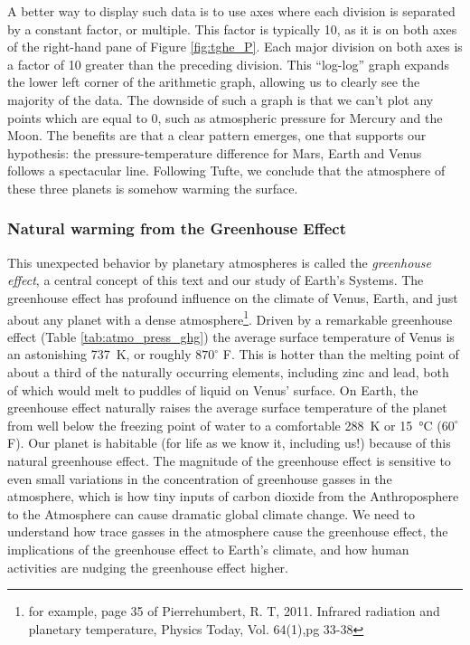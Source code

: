 A better way to display such data is to use axes where each division is separated by a constant factor, or multiple. This factor is typically 10, as it is on both axes of the right-hand pane of Figure \ref{fig:tghe_P}. Each major division on both axes is a factor of 10 greater than the preceding division. This ``log-log'' graph expands the lower left corner of the arithmetic graph, allowing us to clearly see the majority of the data. The downside of such a graph is that we can't plot any points which are equal to 0, such as atmospheric pressure for Mercury and the Moon. The benefits are that a clear pattern emerges, one that supports our hypothesis: the pressure-temperature difference for Mars, Earth and Venus follows a spectacular line. Following Tufte, we conclude that the atmosphere of these three planets is somehow warming the surface.\\

\subsubsection{Natural warming from the Greenhouse Effect}
This unexpected behavior by planetary atmospheres is called the \emph{greenhouse effect}, a central concept of this text and our study of Earth's Systems. The greenhouse effect has profound influence on the climate of Venus, Earth, and just about any planet with a dense atmosphere\footnote{for example, page 35 of Pierrehumbert, R. T, 2011. Infrared radiation and planetary temperature, Physics Today, Vol. 64(1),pg 33-38}. Driven by a remarkable greenhouse effect (Table \ref{tab:atmo_press_ghg}) the average surface temperature of Venus is an astonishing \SI{737}{\kelvin}, or roughly ${870}^{\circ}$ F. This is hotter than the melting point of about a third of the naturally occurring elements, including zinc and lead, both of which would melt to puddles of liquid on Venus' surface. On Earth, the greenhouse effect naturally raises the average surface temperature of the planet from well below the freezing point of water to a comfortable \SI{288}{\kelvin} or \SI{15}{\celsius} (${60}^{\circ}$ F). Our planet is habitable (for life as we know it, including us!) because of this natural greenhouse effect. The magnitude of the greenhouse effect is sensitive to even small variations in the concentration of greenhouse gasses in the atmosphere, which is how tiny inputs of carbon dioxide from the Anthroposphere to the Atmosphere can cause dramatic global climate change. We need to understand how trace gasses in the atmosphere cause the greenhouse effect, the implications of the greenhouse effect to Earth's climate, and how human activities are nudging the greenhouse effect higher.

